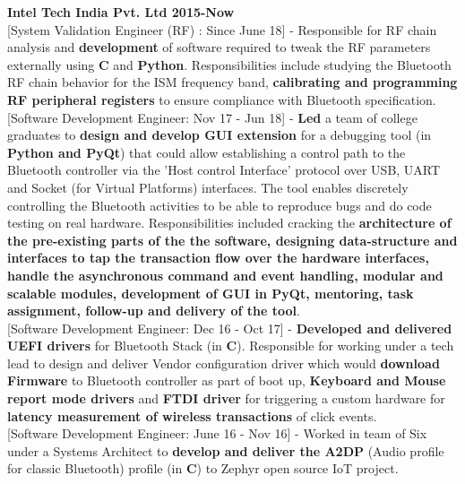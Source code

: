 
\vspace{-2cm} \reversemarginpar {}
\noindent \textbf{\textcolor{ultramarine}{Intel Tech India Pvt. Ltd \hfill 2015-Now}
}\\
\textcolor{ultramarine}{[System Validation Engineer (RF) : Since June 18]} - Responsible for RF chain analysis and \textbf{development} of software required to tweak the RF parameters externally using \textbf{C} and \textbf{Python}. Responsibilities include studying the Bluetooth RF chain behavior for the ISM frequency band, \textbf{calibrating and programming RF peripheral registers} to ensure compliance with Bluetooth specification.\\

\noindent \textcolor{ultramarine}{[Software Development Engineer: Nov 17 - Jun 18]} - \textbf{Led} a team of college graduates to \textbf{design and develop GUI extension} for a debugging tool (in \textbf{Python and PyQt}) that could allow establishing a control path to the Bluetooth controller via the 'Host control Interface' protocol over USB, UART and Socket (for Virtual Platforms) interfaces. The tool enables discretely controlling the Bluetooth activities to be able to reproduce bugs and do code testing on real hardware. Responsibilities included cracking the \textbf{architecture of the pre-existing parts of the the software, designing data-structure and interfaces to tap the transaction flow over the hardware interfaces, handle the asynchronous command and event handling, modular and scalable modules, development of GUI in PyQt, mentoring, task assignment, follow-up and delivery of the tool}. \\

\noindent \textcolor{ultramarine}{[Software Development Engineer: Dec 16 - Oct 17]} - \textbf{Developed and delivered UEFI drivers} for Bluetooth Stack (in \textbf{C}). Responsible for working under a tech lead to design and deliver Vendor configuration driver which would \textbf{download Firmware} to Bluetooth controller as part of boot up, \textbf{Keyboard and Mouse report mode drivers} and \textbf{FTDI driver} for triggering a custom hardware for \textbf{latency measurement of wireless transactions} of click events.\\

\noindent \textcolor{ultramarine}{[Software Development Engineer: June 16 - Nov 16]} - Worked in team of Six under a Systems Architect to \textbf{develop and deliver the A2DP} (Audio profile for classic Bluetooth) profile (in \textbf{C}) to Zephyr open source IoT project. \\

